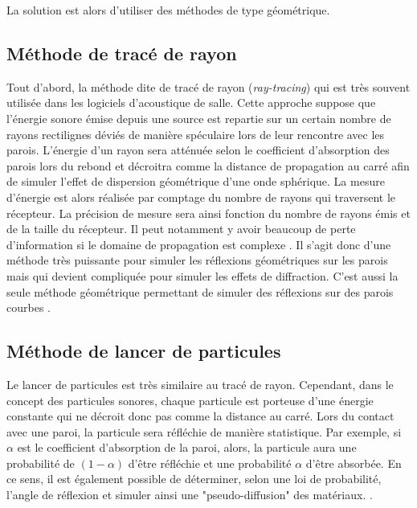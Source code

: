 La solution est alors d'utiliser des méthodes de type géométrique.

	\subsection{Méthode de tracé de rayon}
Tout d'abord, la méthode dite de tracé de rayon (\textit{ray-tracing}) qui est très souvent utilisée dans les logiciels d'acoustique de salle. Cette approche suppose que l’énergie sonore émise depuis une source est repartie sur un certain nombre de rayons rectilignes déviés de manière spéculaire lors de leur rencontre avec les parois. L'énergie d'un rayon sera atténuée selon le coefficient d'absorption des parois lors du rebond et décroitra comme la distance de propagation au carré afin de simuler l'effet de dispersion géométrique d'une onde sphérique. La mesure d'énergie est alors réalisée par comptage du nombre de rayons qui traversent le récepteur. La précision de mesure sera ainsi fonction du nombre de rayons émis et de la taille du récepteur. Il peut notamment y avoir beaucoup de perte d'information si le domaine de propagation est complexe \cite[p. 60]{picaut}. Il s'agit donc d'une méthode très puissante pour simuler les réflexions géométriques sur les parois mais qui devient compliquée pour simuler les effets de diffraction. C'est aussi la seule méthode géométrique permettant de simuler des réflexions sur des parois courbes \cite[p. 13]{Kandelman}.

	\subsection{Méthode de lancer de particules}
Le lancer de particules est très similaire au tracé de rayon. Cependant, dans le concept des particules sonores, chaque particule est porteuse d’une énergie constante qui ne décroit donc pas comme la distance au carré. Lors du contact avec une paroi, la particule sera réfléchie de manière statistique. Par exemple, si $\alpha$ est le coefficient d'absorption de la paroi, alors, la particule aura une probabilité de $(1-\alpha)$ d'être réfléchie et une probabilité $\alpha$ d'être absorbée. En ce sens, il est également possible de déterminer, selon une loi de probabilité, l'angle de réflexion et simuler ainsi une "pseudo-diffusion" des matériaux. \cite[p. 62]{picaut}.
	
